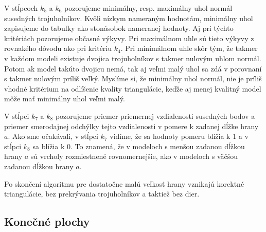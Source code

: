 V stĺpcoch $k_5$ a $k_6$ pozorujeme minimálny, resp. maximálny uhol normál susedných trojuholníkov.
Kvôli nízkym nameraným hodnotám, minimálny uhol zapisujeme do tabuľky ako stonásobok nameranej hodnoty. Aj 
pri týchto kritériách pozorujeme občasné výkyvy. Pri maximálnom uhle sú tieto výkyvy z rovnakého dôvodu
ako pri kritériu $k_4$. Pri minimálnom uhle skôr tým, že takmer v každom modeli existuje dvojica trojuholníkov
s takmer nulovým uhlom normál. Potom ak model takúto dvojicu nemá, tak aj veľmi malý uhol sa zdá v porovnaní s takmer
nulovým príliš veľký. Myslíme si, že minimálny uhol normál, nie je príliš vhodné kritérium na odlíšenie
kvality triangulácie, keďže aj menej kvalitný model môže mať minimálny uhol veľmi malý.

V stĺpci $k_7$ a $k_8$ pozorujeme priemer priemernej vzdialenosti susedných bodov a priemer smerodajnej odchýlky 
tejto vzdialenosti v pomere k zadanej dĺžke hrany $a$. Ako sme očakávali, v stĺpci $k_7$ vidíme, že sa hodnoty pomeru
blížia k $1$ a v stĺpci $k_8$ sa blížia k $0$. To znamená, že v modeloch s menšou zadanou dĺžkou hrany $a$ sú 
vrcholy rozmiestnené rovnomernejšie, ako v modeloch s väčšou zadanou dĺžkou hrany $a$.

Po skončení algoritmu pre dostatočne malú veľkosť hrany vznikajú korektné triangulácie,
bez prekrývania trojuholníkov a taktiež bez dier.
\newpage
\subsection{Konečné plochy}

